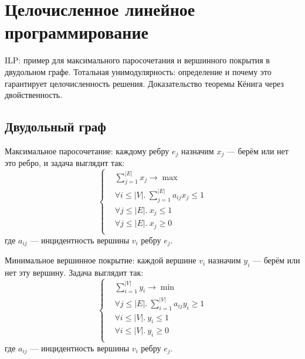 \section{Целочисленное линейное программирование}
ILP: пример для максимального паросочетания
и вершинного покрытия в двудольном графе.
Тотальная унимодулярность:
определение и почему это гарантирует целочисленность решения.
Доказательство теоремы Кёнига через двойственность.

\subsection{Двудольный граф}
Максимальное паросочетание:
каждому ребру $e_j$ назначим $x_j$
--- берём или нет это ребро,
и задача выглядит так:
\[
    \left\{
        \begin{aligned}
            & \sum_{j=1}^{|E|} x_j \to \max \\
            & \forall i \le |V|.~\sum_{j=1}^{|E|} a_{ij} x_j \le 1 \\
            & \forall j \le |E|.~x_j \le 1 \\
            & \forall j \le |E|.~x_j \ge 0 \\
        \end{aligned}
    \right.
\]
где $a_{ij}$ --- инцидентность вершины $v_i$ ребру $e_j$.

Минимальное вершинное покрытие:
каждой вершине $v_i$ назначим $y_i$
--- берём или нет эту вершину.
Задача выглядит так:
\[
    \left\{
        \begin{aligned}
            & \sum_{i=1}^{|V|} y_i \to \min \\
            & \forall j \le |E|.~\sum_{i=1}^{|V|} a_{ij} y_i \ge 1 \\
            & \forall i \le |V|.~y_i \le 1 \\
            & \forall i \le |V|.~y_i \ge 0 \\
        \end{aligned}
    \right.
\]
где $a_{ij}$ --- инцидентность вершины $v_i$ ребру $e_j$.

